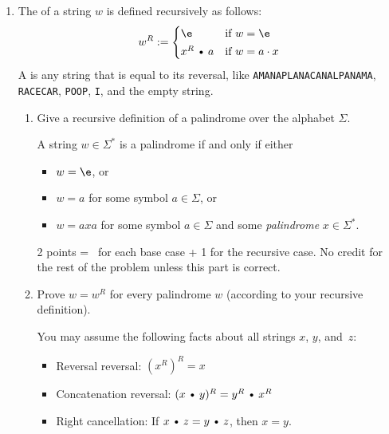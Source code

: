\documentclass[11pt]{article}
\def\Cdot{\mathbin{\text{\normalfont \textbullet}}}
\def\Sym#1{\texttt{\color{BrickRed}#1}}
\begin{document}
\begin{enumerate}
\begin{enumerate}
\begin{rubric}
5 points: Standard induction rubric (scaled).  This is more detail than necessary for full credit.
\end{rubric}

\end{enumerate}

\newpage
\item
The  of a string $w$ is defined recursively as follows:
\[	
	w^R := \begin{cases}
		\e & \text{if $w=\e$} \\[0.5ex]
		x^R \Cdot a & \text{if $w=a\cdot x$}
	\end{cases}
\]
A  is any string that is equal to its reversal, like \Sym{AMANAPLANACANALPANAMA}, \hbox{\Sym{RACECAR}}, \Sym{POOP}, \Sym{I}, and the empty string.

\begin{enumerate}
\item
Give a recursive definition of a palindrome over the alphabet $\Sigma$.

\begin{Solution}
A string $w\in\Sigma^*$ is a palindrome if and only if either
\begin{itemize}
\item $w = \e$, or
\item $w = a$ for some symbol $a\in\Sigma$, or
\item $w = axa$ for some symbol $a\in\Sigma$ and some \emph{palindrome} $x\in\Sigma^*$.
\end{itemize}
\end{Solution}
\unskip
\begin{rubric}
2 points = \textonehalf\ for each base case + 1 for the recursive case.
No credit for the rest of the problem unless this part is correct.
\end{rubric}

\item
Prove $w = w^R$ for every palindrome $w$ (according to your recursive definition).  

You may assume the following facts about all strings $x$, $y$, and~$z$:
\begin{itemize}
\item Reversal reversal: $(x^R)^R = x$
\item Concatenation reversal: $(x\Cdot y)^R = y^R\Cdot x^R$
\item Right cancellation:  If $x\Cdot z = y\Cdot z$, then $x = y$.
\end{itemize}



\end{enumerate}
\end{enumerate}
\end{document}
